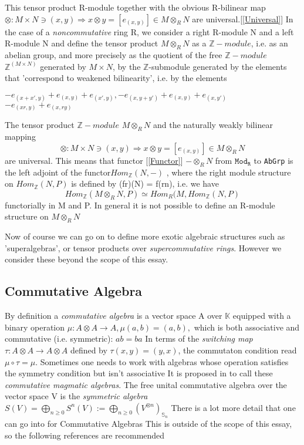 \documentclass[preprint, 5p, 10pt]{elsarticle}
\theoremstyle{plain}
\begin{document}
This tensor product R-module together with the obvious R-bilinear map 
$
 \otimes: M \times N \ni (x,y) \Rightarrow x \otimes y = [e_{(x,y)}] \in M \otimes_{R} N
$
are universal.[\ref{Universal}]
 In the case of a \emph{noncommutative} ring R, we consider a right R-module N and a left R-module
N and define the tensor product $M \otimes_{R} N$ as a $\mathbb{Z}-module$, i.e. as an abelian group, and 
more precisely as the quotient of the free $\mathbb{Z}-module$ $\mathbb{Z}^{(M \times N)}$ generated by 
$M \times N$, by the $\mathbb{Z}$-submodule generated by the elements that 'correspond to weakened bilinearity',
i.e. by the elements \\
\begin{center}
$ -e_{(x+x',y)} + e_{(x,y)} + e_{(x',y)}, -e_{(x,y+y')}+e_{(x,y)}+e_{(x,y')}$\\
$-e_{(xr,y)} + e_{(x,ry)} $\end{center}
The tensor product $\mathbb{Z}-module$ $M \otimes_{R} N$ 
and the naturally weakly bilinear mapping\begin{displaymath}
 \otimes: M \times N \ni (x,y) \Rightarrow x \otimes y = [e_{(x,y)}] \in M \otimes_{R} N
\end{displaymath}
are universal. This means that functor [\ref{Functor}] $-\otimes_{R}N$ from $\mathtt{Mod_{R}}$ to \texttt{AbGrp}
is the left adjoint of the functor$Hom_{\mathbb{Z}}(N, -)$ , where the right module structure on $Hom_{\mathbb{Z}}(N, P)$
is defined by (fr)(N) = f(rn), i.e. we have
\begin{displaymath}
 Hom_{\mathbb{Z}}(M \otimes_{R} N, P) \simeq  Hom_{R}(M, Hom_{\mathbb{Z}}(N,P)
\end{displaymath}
functorially in M and P. In general it is not possible to define an R-module structure on $M \otimes_{R} N$

Now of course we can go on to define more exotic algebraic structures such as 'superalgebras', or tensor products
over \emph{supercommutative rings}. However we consider these beyond the scope of this essay. 
\subsection{Commutative Algebra}
By definition a \textit{commutative algebra} is a vector space A over $\mathbb{K}$ equipped with a
binary operation $\mu:A \otimes A \rightarrow A,\mu(a,b)=(a,b),$ which is both associative and commutative
(i.e. symmetric): 
$
 ab = ba
$
In terms of the \textit{switching map} 
$
 \tau:A \otimes A \rightarrow A \otimes A
$
defined by $\tau(x,y)=(y,x)$, the commutaton condition read $\mu \circ \tau = \mu$.
  Sometimes one needs to work with algebras whose operation satisfies the symmetry condition but isn't associative
It is proposed in \cite{AlgebraicOperads} to call these \textit{commutative magmatic algebras}.
\phantom{xxxx}The free unital commutative algebra over the vector space V is
the \textit{symmetric algebra}
$
 S(V) = \bigoplus_{n\geq0}S^{n}(V):= \bigoplus_{n\geq 0}(V^{\otimes n})_{\mathbb{S}_{n}}
$
There is a lot more detail that one can go into for Commutative Algebras
This is outside of the scope of this essay, so the following references are recommended~\cite{AlgebraicOperads,Lang,Yokonuma1992}
\end{document}
